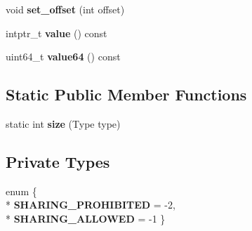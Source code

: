\begin{DoxyCompactItemize}
\item 
void {\bfseries set\+\_\+offset} (int offset)\hypertarget{classv8_1_1internal_1_1_constant_pool_entry_a8d63e159ab6e3dc4bdfa6c7b317dc898}{}\label{classv8_1_1internal_1_1_constant_pool_entry_a8d63e159ab6e3dc4bdfa6c7b317dc898}

\item 
intptr\+\_\+t {\bfseries value} () const \hypertarget{classv8_1_1internal_1_1_constant_pool_entry_a98c8b65e7484a3b754c0f9729dfe5fe8}{}\label{classv8_1_1internal_1_1_constant_pool_entry_a98c8b65e7484a3b754c0f9729dfe5fe8}

\item 
uint64\+\_\+t {\bfseries value64} () const \hypertarget{classv8_1_1internal_1_1_constant_pool_entry_a700812656bd17b4e9fab158fb08a5a6d}{}\label{classv8_1_1internal_1_1_constant_pool_entry_a700812656bd17b4e9fab158fb08a5a6d}

\end{DoxyCompactItemize}
\subsection*{Static Public Member Functions}
\begin{DoxyCompactItemize}
\item 
static int {\bfseries size} (Type type)\hypertarget{classv8_1_1internal_1_1_constant_pool_entry_a11980869d87e0390dcea4827cc067fb0}{}\label{classv8_1_1internal_1_1_constant_pool_entry_a11980869d87e0390dcea4827cc067fb0}

\end{DoxyCompactItemize}
\subsection*{Private Types}
\begin{DoxyCompactItemize}
\item 
enum \{ \\*
{\bfseries S\+H\+A\+R\+I\+N\+G\+\_\+\+P\+R\+O\+H\+I\+B\+I\+T\+ED} = -\/2, 
\\*
{\bfseries S\+H\+A\+R\+I\+N\+G\+\_\+\+A\+L\+L\+O\+W\+ED} = -\/1
 \}\hypertarget{classv8_1_1internal_1_1_constant_pool_entry_a1134a7d476858b1dd257f363bbd4eef0}{}\label{classv8_1_1internal_1_1_constant_pool_entry_a1134a7d476858b1dd257f363bbd4eef0}

\end{DoxyCompactItemize}
